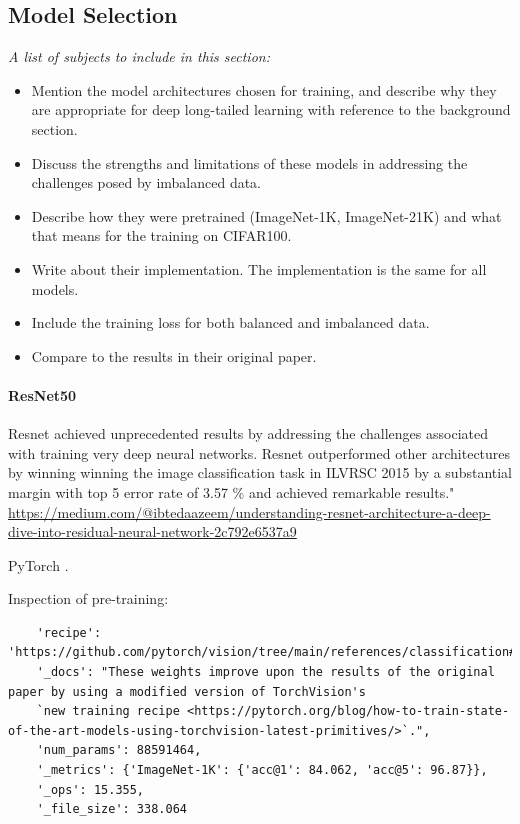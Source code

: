 \subsection{Model Selection}
\label{sec:model_selection}
\textit{A list of subjects to include in this section:}

\begin{itemize}
    \item Mention the model architectures chosen for training, and describe why they are appropriate for deep long-tailed learning with reference to the background section.
    \item Discuss the strengths and limitations of these models in addressing the challenges posed by imbalanced data.
    \item Describe how they were pretrained (ImageNet-1K, ImageNet-21K) and what that means for the training on CIFAR100.
    \item Write about their implementation. The implementation is the same for all models. 
    \item Include the training loss for both balanced and imbalanced data.
    \item Compare to the results in their original paper. 
\end{itemize}

\paragraph{ResNet50}
Resnet achieved unprecedented results by addressing the challenges associated with training very deep neural networks.
Resnet outperformed other architectures by winning winning the image classification task in ILVRSC 2015 by a substantial margin with top 5 error rate of 3.57 \% and achieved remarkable results." \url{https://medium.com/@ibtedaazeem/understanding-resnet-architecture-a-deep-dive-into-residual-neural-network-2c792e6537a9}

PyTorch \cite{torchvision-resnet} .

Inspection of pre-training:
\begin{verbatim}
    'recipe': 'https://github.com/pytorch/vision/tree/main/references/classification#convnext', 
    '_docs': "These weights improve upon the results of the original paper by using a modified version of TorchVision's
    `new training recipe <https://pytorch.org/blog/how-to-train-state-of-the-art-models-using-torchvision-latest-primitives/>`.",
    'num_params': 88591464, 
    '_metrics': {'ImageNet-1K': {'acc@1': 84.062, 'acc@5': 96.87}}, 
    '_ops': 15.355, 
    '_file_size': 338.064
\end{verbatim}
    

